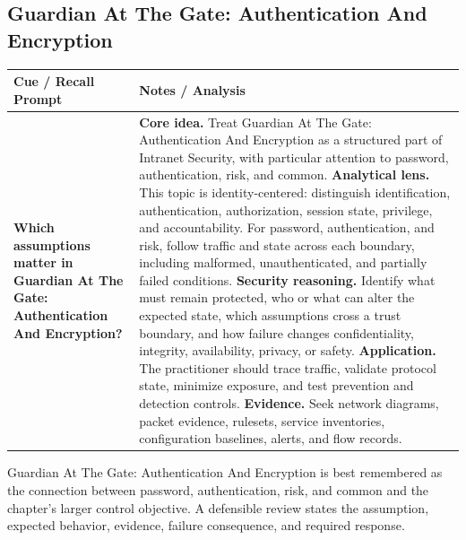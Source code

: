 \documentclass[11pt]{article}
\newcommand{\CornellHeader}{%
\rowcolor{Navy}\color{white}\bfseries Cue / Recall Prompt & \color{white}\bfseries Notes / Analysis\\\hline}
\newcommand{\CornellRow}[2]{%
\cellcolor{CueGray}\RaggedRight\textbf{#1} & \RaggedRight #2\\\hline}
\begin{document}
\subsection*{Guardian At The Gate: Authentication And Encryption}
\begin{longtable}{>{\RaggedRight\arraybackslash}p{}|>{\RaggedRight\arraybackslash}p{}}
\CornellHeader
\CornellRow{Which assumptions matter in Guardian At The Gate: Authentication And Encryption?}{\textbf{Core idea.} Treat Guardian At The Gate: Authentication And Encryption as a structured part of Intranet Security, with particular attention to password, authentication, risk, and common. \textbf{Analytical lens.} This topic is identity-centered: distinguish identification, authentication, authorization, session state, privilege, and accountability. For password, authentication, and risk, follow traffic and state across each boundary, including malformed, unauthenticated, and partially failed conditions. \textbf{Security reasoning.} Identify what must remain protected, who or what can alter the expected state, which assumptions cross a trust boundary, and how failure changes confidentiality, integrity, availability, privacy, or safety. \textbf{Application.} The practitioner should trace traffic, validate protocol state, minimize exposure, and test prevention and detection controls. \textbf{Evidence.} Seek network diagrams, packet evidence, rulesets, service inventories, configuration baselines, alerts, and flow records.}
\end{longtable}
\begin{topicsummary}
Guardian At The Gate: Authentication And Encryption is best remembered as the connection between password, authentication, risk, and common and the chapter's larger control objective. A defensible review states the assumption, expected behavior, evidence, failure consequence, and required response.
\end{topicsummary}
\end{document}
